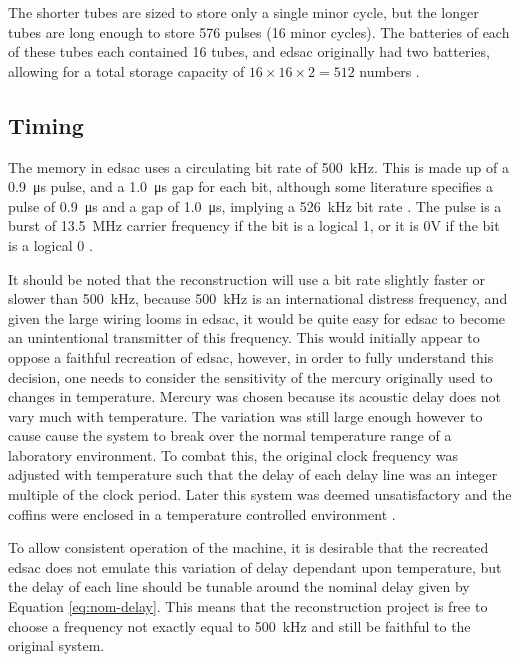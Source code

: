 The shorter tubes are sized to store only a single minor cycle, but the longer tubes are long enough to store 576 pulses (16 minor cycles). The batteries of each of these tubes each contained 16 tubes, and \gls{edsac} originally had two batteries, allowing for a total storage capacity of $16 \times 16 \times 2 = 512$ numbers \cite[p.210]{wilkes1948}.

\subsection{Timing} \label{sec:review-delay-timing}
The memory in \gls{edsac} uses a circulating bit rate of \SI{500}{\kilo\hertz}. This is made up of a \SI{0.9}{\micro\second} pulse, and a \SI{1.0}{\micro\second} gap for each bit, although some literature specifies a pulse of \SI{0.9}{\micro\second} and a gap of  \SI{1.0}{\micro\second}, implying a \SI{526}{\kilo\hertz} bit rate \cite[p.209]{wilkes1948} \cite[p.2]{cambridge1948}. The pulse is a burst of \SI{13.5}{\mega\hertz} carrier frequency if the bit is a logical 1, or it is 0V if the bit is a logical 0 \cite[p.2]{cambridge1948}.

It should be noted that the reconstruction will use a bit rate slightly faster or slower than \SI{500}{\kilo\hertz}, because \SI{500}{\kilo\hertz} is an international distress frequency, and given the large wiring looms in \gls{edsac}, it would be quite easy for \gls{edsac} to become an unintentional transmitter of this frequency. This would initially appear to oppose a faithful recreation of \gls{edsac}, however, in order to fully understand this decision, one needs to consider the sensitivity of the mercury originally used to changes in temperature. Mercury was chosen because its acoustic delay does not vary much with temperature\cite[p.209]{wilkes1948}. The variation was still large enough however to cause cause the system to break over the normal temperature range of a laboratory environment. To combat this, the original clock frequency was adjusted with temperature such that the delay of each delay line was an integer multiple of the clock period. Later this system was deemed unsatisfactory and the coffins were enclosed in a temperature controlled environment \cite[p.81]{wilkes1952}.

To allow consistent operation of the machine, it is desirable that the recreated \gls{edsac} does not emulate this variation of delay dependant upon temperature, but the delay of each line should be tunable around the nominal delay given by Equation \ref{eq:nom-delay}. This means that the reconstruction project is free to choose a frequency not exactly equal to \SI{500}{\kilo\hertz} and still be faithful to the original system.

